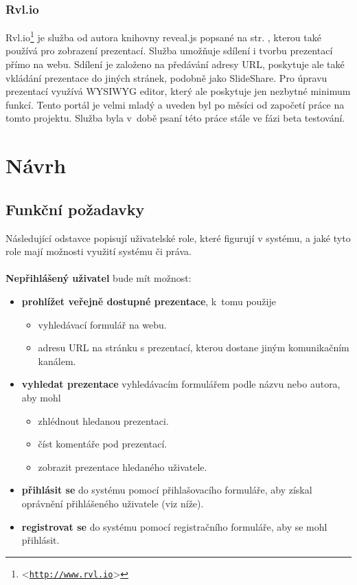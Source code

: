 \documentclass[11pt,twoside,a4paper]{book}
\let\oldUrl\url									%
\renewcommand\url[1]{<\texttt{\oldUrl{#1}}>}
\begin{document}
\subsection{Rvl.io}
Rvl.io\footnote{\url{http://www.rvl.io}} je služba od autora knihovny reveal.js popsané na str. \pageref{chap:revealjs}, kterou také používá pro zobrazení prezentací. Služba umožňuje sdílení i tvorbu prezentací přímo na webu. Sdílení je založeno na předávání adresy URL, poskytuje ale také vkládání prezentace do jiných stránek, podobně jako SlideShare. Pro úpravu prezentací využívá WYSIWYG editor, který ale poskytuje jen nezbytné minimum funkcí. Tento portál je velmi mladý a uveden byl po měsíci od započetí práce na tomto projektu. Služba byla v~době psaní této práce stále ve fázi beta testování.




\chapter{Návrh}

\section{Funkční požadavky}
Následující odstavce popisují uživatelské role, které figurují v systému, a jaké tyto role mají možnosti využití systému či práva.\\\\

\noindent \textbf{Nepřihlášený uživatel} bude mít možnost:
\begin{itemize}
	\item \textbf{prohlížet veřejně dostupné prezentace}, k~tomu použije 
		\begin{itemize}
			\item vyhledávací formulář na webu.
			\item adresu URL na stránku s prezentací, kterou dostane jiným komunikačním kanálem.
		\end{itemize}
	\item \textbf{vyhledat prezentace} vyhledávacím formulářem podle názvu nebo autora, aby mohl
		\begin{itemize}
			\item zhlédnout hledanou prezentaci.
			\item číst komentáře pod prezentací.
			\item zobrazit prezentace hledaného uživatele.
		\end{itemize}
	\item \textbf{přihlásit se} do systému pomocí přihlašovacího formuláře, aby získal oprávnění přihlášeného uživatele (viz níže).
	\item \textbf{registrovat se} do systému pomocí registračního formuláře, aby se mohl přihlásit.
\end{itemize}
\end{document}
